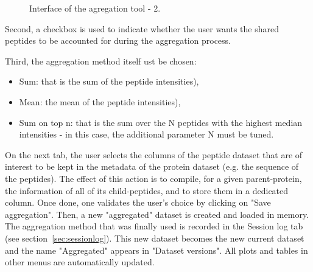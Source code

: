 \documentclass[12pt]{article}
\begin{document}
\begin {figure}
\centering
{}
\caption{Interface of the agregation tool - 2.}\label{fig:agreg2}
\end {figure}


Second, a checkbox is used to indicate whether the user wants the shared 
peptides to be accounted for during the aggregation process.

Third, the aggregation method itself ust be chosen: 
\begin{itemize}
\item Sum: that is the sum of the peptide intensities),
\item Mean: the mean of the peptide intensities),
\item Sum on top n: that is the sum over the N peptides with the highest median 
intensities - in this case, the additional parameter N must be tuned.
\end{itemize}

On the next tab, the user selects the columns of the peptide dataset that 
are of interest to be kept in the metadata of the protein dataset (e.g. the 
sequence of the peptides). The effect of this action is to compile, for a 
given parent-protein, the information of all of its child-peptides, and to 
store them in a dedicated column. Once done, one validates the user's choice 
by clicking on "Save aggregation". Then, a new "aggregated" dataset is 
created and loaded in memory. The aggregation method that was finally used is 
recorded in the Session log tab (see section~\ref{sec:sessionlog}). This new 
dataset becomes the new current dataset and the name "Aggregated" appears in 
"Dataset versions". All plots and tables in other menus are automatically 
updated.
\end{document}

